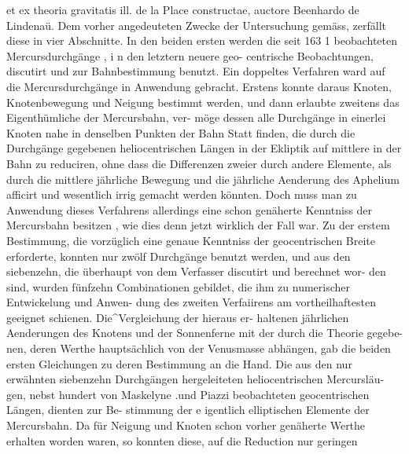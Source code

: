 \documentclass[12pt,a4paper]{article}
\begin{document}
et ex theoria gravitatis ill. de la Place constructae, auctore Beenhardo de Lindenaü.\newline
Dem vorher angedeuteten Zwecke der Untersuchung gemäss, zerfällt diese in vier Abschnitte.\newline
In den beiden ersten werden die seit 163 1 beobachteten Mercursdurchgänge , i n den letztern neuere geo-\newline
centrische Beobachtungen, discutirt und zur Bahnbestimmung benutzt. Ein doppeltes Verfahren ward\newline
auf die Mercursdurchgänge in Anwendung gebracht. Erstens konnte daraus Knoten, Knotenbewegung\newline
und Neigung bestimmt werden, und dann erlaubte zweitens das Eigenthümliche der Mercursbahn, ver-\newline
möge dessen alle Durchgänge in einerlei Knoten nahe in denselben Punkten der Bahn Statt finden, die\newline
durch die Durchgänge gegebenen heliocentrischen Längen in der Ekliptik auf mittlere in der Bahn zu\newline
reduciren, ohne dass die Differenzen zweier durch andere Elemente, als durch die mittlere jährliche\newline
Bewegung und die jährliche Aenderung des Aphelium afficirt und wesentlich irrig gemacht werden\newline
könnten. Doch muss man zu Anwendung dieses Verfahrens allerdings eine schon genäherte Kenntniss\newline
der Mercursbahn besitzen , wie dies denn jetzt wirklich der Fall war. Zu der erstem Bestimmung, die\newline
vorzüglich eine genaue Kenntniss der geocentrischen Breite erforderte, konnten nur zwölf Durchgänge\newline
benutzt werden, und aus den siebenzehn, die überhaupt von dem Verfasser discutirt und berechnet wor-\newline
den sind, wurden fünfzehn Combinationen gebildet, die ihm zu numerischer Entwickelung und Anwen-\newline
dung des zweiten Verfaiirens am vortheilhaftesten geeignet schienen. Die\^{}Vergleichung der hieraus er-\newline
haltenen jährlichen Aenderungen des Knotens und der Sonnenferne mit der durch die Theorie gegebe- \textbullet{}\newline
nen, deren Werthe hauptsächlich von der Venusmasse abhängen, gab die beiden ersten Gleichungen zu\newline
deren Bestimmung an die Hand.\newline
Die aus den nur erwähnten siebenzehn Durchgängen hergeleiteten heliocentrischen Mercursläu-\newline
gen, nebst hundert von Maskelyne .und Piazzi beobachteten geocentrischen Längen, dienten zur Be-\newline
stimmung der e igentlich elliptischen Elemente der Mercursbahn. Da für Neigung und Knoten schon\newline
vorher genäherte Werthe erhalten worden waren, so konnten diese, auf die Reduction nur geringen\newline
\end{document}
